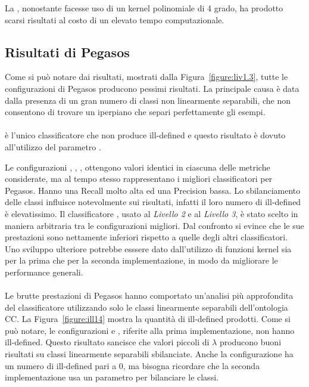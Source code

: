 \documentclass[12pt,a4paper,oneside,hidelinks]{report}
\begin{document}
La , nonostante facesse uso di un kernel polinomiale di 4 grado, ha prodotto scarsi risultati al costo di un elevato tempo computazionale.

\subsection{Risultati di Pegasos}
Come si può notare dai risultati, mostrati dalla Figura~\ref{figure:liv1.3}, tutte le configurazioni di Pegasos producono pessimi risultati. La principale causa è data dalla presenza di un gran numero di classi non linearmente separabili, che non consentono di trovare un iperpiano che separi perfettamente gli esempi. 

\paragraph*{}
 è l'unico classificatore che non produce ill-defined e questo risultato è dovuto all'utilizzo del parametro .

Le configurazioni , , ,  ottengono valori identici in ciascuna delle metriche considerate, ma al tempo stesso rappresentano i migliori classificatori per Pegasos. Hanno una Recall molto alta ed una Precision bassa. Lo sbilanciamento delle classi influisce notevolmente sui risultati, infatti il loro numero di ill-defined è elevatissimo. Il classificatore , usato al \textit{Livello 2} e al \textit{Livello 3}, è stato scelto in maniera arbitraria tra le configurazioni migliori. Dal confronto si evince che le sue prestazioni sono nettamente inferiori rispetto a quelle degli altri classificatori.
Uno sviluppo ulteriore potrebbe esssere dato dall'utilizzo di funzioni kernel sia per la prima che per la seconda implementazione, in modo da migliorare le performance generali.

\paragraph*{}
Le brutte prestazioni di Pegasos hanno comportato un'analisi più approfondita del classificatore utilizzando solo le classi linearmente separabili dell'ontologia CC.
La Figura~\ref{figure:ill14} mostra la quantità di ill-defined prodotti. Come si può notare, le configurazioni  e , riferite alla prima implementazione, non hanno ill-defined. Questo risultato sancisce che valori piccoli di $\lambda$ producono buoni risultati su classi linearmente separabili sbilanciate. Anche la configurazione  ha un numero di ill-defined pari a 0, ma bisogna ricordare che la seconda implementazione usa un parametro per bilanciare le classi.
\end{document}
